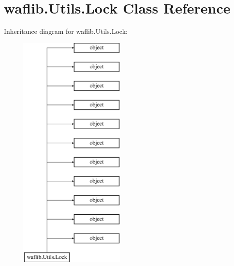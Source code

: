 \hypertarget{classwaflib_1_1_utils_1_1_lock}{}\section{waflib.\+Utils.\+Lock Class Reference}
\label{classwaflib_1_1_utils_1_1_lock}
Inheritance diagram for waflib.\+Utils.\+Lock\+:\begin{figure}[H]
\begin{center}
\leavevmode
\includegraphics[height=12.000000cm]{classwaflib_1_1_utils_1_1_lock}
\end{center}
\end{figure}
